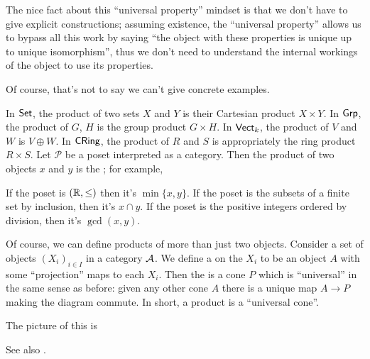 The nice fact about this ``universal property'' mindset
is that we don't have to give explicit constructions; assuming existence,
the ``universal property'' allows us to bypass all this work by saying
``the object with these properties is unique up to unique isomorphism'',
thus we don't need to understand the internal workings of the object
to use its properties.

Of course, that's not to say we can't give concrete examples.
\begin{example}
	\listhack
	\begin{enumerate}[(a)]
		\ii In $\catname{Set}$, the product of two sets
		$X$ and $Y$ is their Cartesian product $X \times Y$.
		\ii In $\catname{Grp}$, the product of $G$, $H$
		is the group product $G \times H$.
		\ii In $\catname{Vect}_k$, the product
		of $V$ and $W$ is $V \oplus W$.
		\ii In $\catname{CRing}$, the product
		of $R$ and $S$ is appropriately the ring product $R \times S$.
		\ii Let $\mathcal P$ be a poset interpreted as a category.
		Then the product of two objects $x$ and $y$
		is the ; for example,
		\begin{itemize}
			\ii If the poset is $(\RR, \le)$ then it's $\min\{x,y\}$.
			\ii If the poset is the subsets
			of a finite set by inclusion,
			then it's $x \cap y$.
			\ii If the poset is the positive integers ordered by division,
			then it's $\gcd(x,y)$.
		\end{itemize}
	\end{enumerate}
\end{example}

Of course, we can define products of more than just two objects.
Consider a set of objects $(X_i)_{i \in I}$ in a category $\AA$.
We define a  on the $X_i$ to be an object $A$
with some ``projection'' maps to each $X_i$.
Then the  is a cone $P$ which is ``universal'' in the same sense as before:
given any other cone $A$ there is a unique map $A \to P$ making the diagram commute.
In short, a product is a ``universal cone''.

The picture of this is
\begin{center}
\end{center}
See also .

